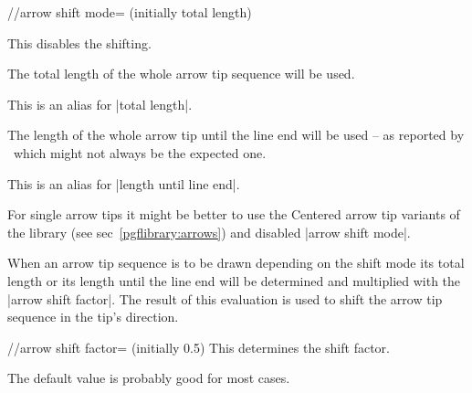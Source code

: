\begin{multicols}{2}
\begin{key}{/\tikzext/arrow shift mode= (initially total length)}
\begin{description}
  This disables the shifting.
\item[|arrow shift mode|=\declare{|total length|}]

  The total length of the whole arrow tip sequence will be used.
\item[|arrow shift mode|=\declare{|total|}]

  This is an alias for |total length|.
\item[|arrow shift mode|=\declare{|length until line end|}]

  The length of the whole arrow tip until the line end will be used --
  as reported by \pgfname\ which might not always be the expected one.
\item[|arrow shift mode|=\declare{|line end|}]

  This is an alias for |length until line end|.
\end{description}
\begin{codeexample}[preamble=\usetikzlibrary{ext.arrows-plus}]
\end{codeexample}

For single arrow tips it might be better to use the Centered arrow tip variants
of the  library (see sec~\ref{pgflibrary:arrows})
and disabled |arrow shift mode|.
\end{key}

When an arrow tip sequence is to be drawn depending on the shift mode
its total length or its length until the line end will be determined
and multiplied with the |arrow shift factor|.
The result of this evaluation is used to shift the arrow tip sequence
in the tip's direction.

\begin{key}{/\tikzext/arrow shift factor= (initially 0.5)}
  This determines the shift factor.
  
  The default value is probably good for most cases.
\end{key}


\end{multicols}
